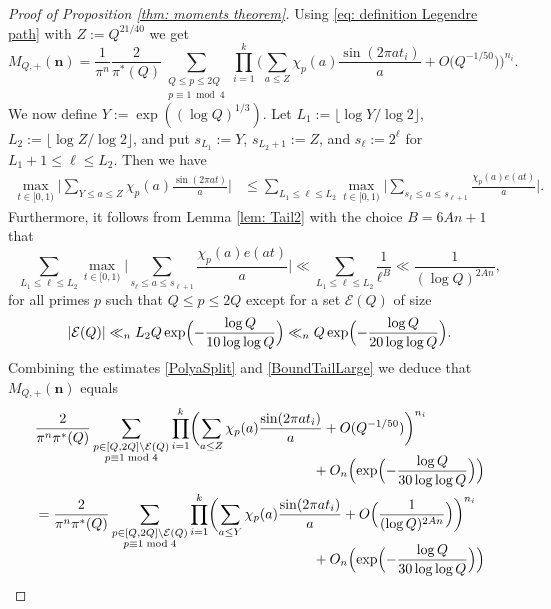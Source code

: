\documentclass[10pt]{amsart}
\theoremstyle{plain}
\theoremstyle{definition}
\newcommand{\un}{\boldsymbol{n}}
\begin{document}
\begin{proof}[Proof of Proposition \ref{thm: moments theorem}]
Using \eqref{eq: definition Legendre path} with $Z:= Q^{21/40}$ we get
\[
M_{Q, +}(\un)= \frac{1}{\pi^n} \frac{2}{\pi^*(Q)} \sum_{\substack{Q\leq p\leq 2Q\\ p\equiv 1\bmod 4}}\prod_{i=1}^k \biggl(\sum_{a\leq Z} \chi_p(a) \frac{\sin(2\pi at_i)}{a}+ O\bigl(Q^{-1/50}\bigr)\biggr)^{n_i}.
\]
We now define $Y:=\exp((\log Q)^{1/3})$.
Let $L_1:=\lfloor \log Y /\log 2\rfloor$, $L_2:= \lfloor \log Z/\log 2\rfloor$, and put $s_{L_1}:= Y$, $s_{L_2+1}:= Z$, and $s_{\ell}:=2^{\ell}$ for $L_1+1\leq \ell\leq L_2$.
Then we have
\begin{equation}\label{PolyaSplit}
\begin{aligned}
\max_{t\in [0, 1)} \biggl|\sum_{Y\leq a\leq Z} \chi_p(a) \frac{\sin(2\pi at)}{a}\biggr|
& \leq \sum_{L_1\leq \ell \leq L_2} \max_{t \in [0, 1)} \biggl|\sum_{s_{\ell}\leq a\leq s_{\ell+1}} \frac{\chi_p(a)e(at)}{a}\biggr|.
\end{aligned}
\end{equation}
Furthermore, it follows from Lemma \ref{lem: Tail2} with the choice $B=6An+1$ that
\begin{equation}\label{BoundTailLarge}
\sum_{L_1\leq \ell \leq L_2} \max_{t \in [0, 1)} \biggl|\sum_{s_{\ell}\leq a\leq s_{\ell+1}} \frac{\chi_p(a)e(at)}{a}\biggr|
\ll
\sum_{L_1\leq \ell \leq L_2} \frac{1}{\ell^B} \ll \frac{1}{(\log Q)^{2An}},
\end{equation}
for all primes $p$ such that $Q\leq p\leq 2Q$ except for a set $\mathcal{E}(Q)$ of size
\[
|\mathcal{E}(Q)| \ll_n L_2 Q \exp\Bigl(-\frac{\log Q }{10 \log\log Q}\Bigr) \ll_n Q \exp\Bigl(-\frac{\log Q}{20 \log\log Q}\Bigr).\]
Combining the estimates \eqref{PolyaSplit} and \eqref{BoundTailLarge} we deduce that $M_{Q, +}(\un)$ equals
\begin{align*}
&\frac{2}{\pi^n\pi^*(Q)} \sum_{\substack{p\in [Q, 2Q]\setminus \mathcal{E}(Q)\\ p\equiv 1\bmod 4}}\prod_{i=1}^k \biggl(\sum_{a\leq Z} \chi_p(a) \frac{\sin(2\pi at_i)}{a}+ O(Q^{-1/50})\biggl)^{n_i}\\[-10pt]
& \hspace*{7cm} + O_n\Bigl(\exp\Bigl(-\frac{\log Q}{30\log\log Q}\Bigr)\Bigr)\\
&= \frac{2}{\pi^n\pi^*(Q)} \sum_{\substack{p\in [Q, 2Q]\setminus \mathcal{E}(Q)\\ p\equiv 1\bmod 4}}\prod_{i=1}^k \biggl(\sum_{a\leq Y} \chi_p(a) \frac{\sin(2\pi at_i)}{a}+ O\Bigl(\frac{1}{(\log Q)^{2An}}\Bigr)\biggr)^{n_i}\\[-8pt]
& \hspace*{7cm} + O_n\Bigl(\exp\Bigl(-\frac{\log Q}{30\log\log Q}\Bigr)\Bigr)\\

\end{align*}
\end{proof}
\end{document}

